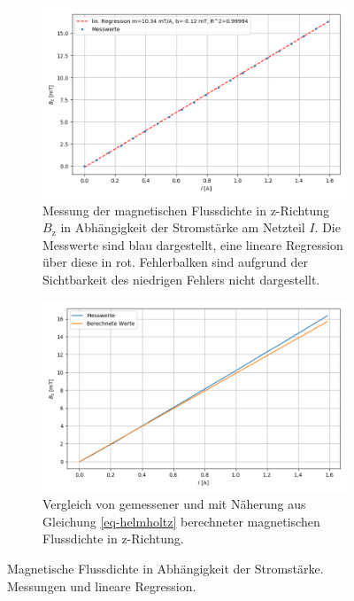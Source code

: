 \documentclass[page,pdftex,12pt,a4paper,twoside,openright]{scrbook}
\begin{document}
\begin{figure}[h]
\begin{subfigure}[t]{0.49\textwidth}
\includegraphics[width=\textwidth]{img/B(I).png}
\caption{Messung der magnetischen Flussdichte in z-Richtung $B_\mathrm{z}$ in Abhängigkeit der Stromstärke am Netzteil $I$. Die Messwerte sind blau dargestellt, eine lineare Regression über diese in rot. Fehlerbalken sind aufgrund der Sichtbarkeit des niedrigen Fehlers nicht dargestellt.}
\label{fig-magnetfeldstrom}
\end{subfigure}%
\begin{subfigure}[t]{0.49\textwidth}
\includegraphics[width=\textwidth]{img/b_calc.png}
\caption{Vergleich von gemessener und mit Näherung aus Gleichung \ref{eq-helmholtz} berechneter magnetischen Flussdichte in z-Richtung.}
\label{fig-b_helmholtz}
\end{subfigure}
\caption{Magnetische Flussdichte in Abhängigkeit der Stromstärke. Messungen und lineare Regression.}
\end{figure}
\end{document}
